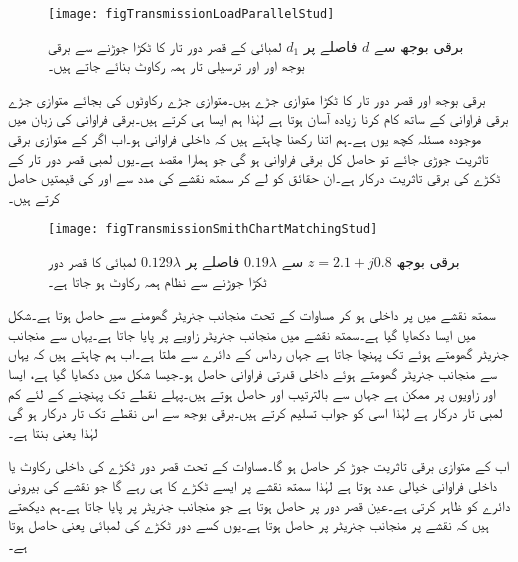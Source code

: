\begin{figure}
\centering
\texttt{[image: figTransmissionLoadParallelStud]}
\caption{برقی بوجھ سے $d$ فاصلے پر $d_1$ لمبائی کے قصر دور تار کا ٹکڑا جوڑنے سے برقی بوجھ اور اور ترسیلی تار ہمہ رکاوٹ بنائے جاتے ہیں۔}
\label{شکل_ترسیلی_ہمہ_رکاوٹی_بمدد_ٹکڑا_تار}
\end{figure}

برقی بوجھ اور قصر دور تار کا ٹکڑا متوازی جڑے ہیں۔متوازی جڑے رکاوٹوں کی بجائے متوازی جڑے برقی فراوانی کے ساتھ کام کرنا زیادہ آسان ہوتا ہے لہٰذا ہم ایسا ہی کرتے ہیں۔برقی فراوانی کی زبان میں موجودہ مسئلہ کچھ یوں ہے۔ہم  اتنا رکھنا چاہتے ہیں کہ داخلی فراوانی  ہو۔اب اگر  کے متوازی  برقی تاثریت جوڑی جائے تو حاصل کل برقی فراوانی  ہو گی جو ہمارا مقصد ہے۔یوں  لمبی قصر دور تار کے ٹکڑے کی برقی تاثریت  درکار ہے۔ان حقائق کو لے کر سمتھ نقشے کی مدد سے  اور  کی قیمتیں حاصل کرتے ہیں۔

\begin{figure}
\centering
\texttt{[image: figTransmissionSmithChartMatchingStud]}
\caption{برقی بوجھ $z=2.1+j0.8$ سے $0.19\lambda$ فاصلے پر $0.129\lambda$ لمبائی کا قصر دور ٹکڑا جوڑنے سے نظام ہمہ رکاوٹ ہو جاتا ہے۔}
\label{شکل_ترسیلی_ہمہ_رکاوٹی_ٹکڑے_کا_نقشہ}
\end{figure}

سمتھ نقشے میں  پر داخلی ہو کر مساوات  کے تحت منجانب جنریٹر  گھومنے سے  حاصل ہوتا ہے۔شکل  میں ایسا دکھایا گیا ہے۔سمتھ نقشے میں  منجانب جنریٹر  زاویے پر پایا جاتا ہے۔یہاں سے منجانب جنریٹر  گھومتے ہوئے  تک پہنچا جاتا ہے جہاں  رداس کے دائرے سے  ملتا ہے۔اب ہم چاہتے ہیں کہ یہاں سے  منجانب جنریٹر  گھومتے ہوئے  داخلی قدرتی فراوانی  حاصل ہو۔جیسا شکل میں دکھایا گیا ہے، ایسا  اور  زاویوں پر ممکن ہے جہاں سے بالترتیب  اور   حاصل ہوتے ہیں۔پہلے نقطے تک پہنچنے کے لئے کم لمبی تار درکار ہے لہٰذا اسی کو جواب تسلیم کرتے ہیں۔برقی بوجھ سے اس نقطے تک  تار درکار ہو گی لہٰذا  یعنی  بنتا ہے۔

 اب  کے متوازی  برقی تاثریت جوڑ کر  حاصل ہو گا۔مساوات  کے تحت قصر دور ٹکڑے کی داخلی رکاوٹ یا داخلی فراوانی خیالی عدد ہوتا ہے لہٰذا سمتھ نقشے پر ایسے ٹکڑے کا  ہی رہے گا جو نقشے کی بیرونی دائرے کو ظاہر کرتی ہے۔عین قصر دور پر  حاصل ہوتا ہے جو منجانب جنریٹر   پر پایا جاتا ہے۔ہم دیکھتے ہیں کہ  نقشے پر منجانب جنریٹر  پر حاصل ہوتا ہے۔یوں کسے دور ٹکڑے کی لمبائی  یعنی  حاصل ہوتا ہے۔   


